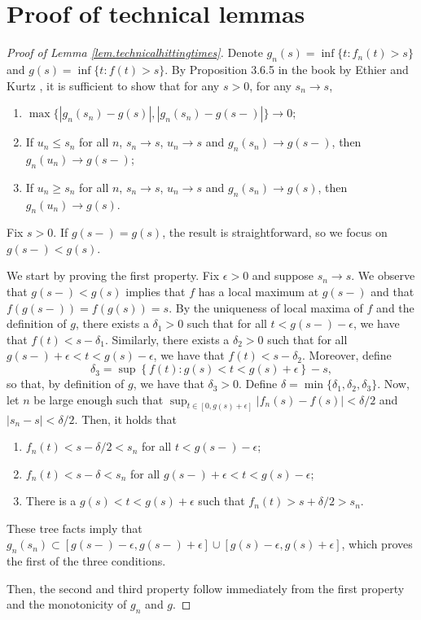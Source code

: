 \section{Proof of technical lemmas}\label{app.technical}
\begin{proof}[Proof of Lemma \ref{lem.technicalhittingtimes}]
Denote $g_n(s)=\inf\{t:f_n(t)>s\}$ and $g(s)=\inf\{t:f(t)>s\}$. By Proposition 3.6.5 in the book by Ethier and Kurtz \cite{ethierMarkovProcessesCharacterization2005}, it is sufficient to show that for any $s>0$, for any $s_n\to s$, 
\begin{enumerate}
    \item $\max\{|g_n(s_n)-g(s)|,|g_n(s_n)-g(s-)|\}\to 0$;
    \item If $u_n\leq s_n$ for all $n$, $s_n\to s$, $u_n\to s$ and $g_n(s_n)\to g(s-)$, then $g_n(u_n)\to g(s-)$;
    \item If $u_n\geq s_n$ for all $n$, $s_n\to s$, $u_n\to s$ and $g_n(s_n)\to g(s)$, then $g_n(u_n)\to g(s)$. 
\end{enumerate}
Fix $s>0$. If $g(s-)=g(s)$, the result is straightforward, so we focus on $g(s-)<g(s)$.  

We start by proving the first property. Fix $\epsilon>0$ and suppose $s_n\to s$. We observe that $g(s-)<g(s)$ implies that $f$ has a local maximum at $g(s-)$ and that $f(g(s-))=f(g(s))=s$. By the uniqueness of local maxima of $f$ and the definition of $g$, there exists a $\delta_1>0$ such that for all $t<g(s-)-\epsilon$, we have that $f(t)<s-\delta_1$. Similarly, there exists a $\delta_2>0$ such that for all $g(s-)+\epsilon<t<g(s)-\epsilon$, we have that $f(t)<s-\delta_2$. Moreover, define $$\delta_3=\sup\left\{f(t):g(s)<t<g(s)+\epsilon\right\}-s,$$ so that, by definition of $g$, we have that $\delta_3>0$. Define $\delta=\min\{\delta_1,\delta_2,\delta_3\}$. 
Now, let $n$ be large enough such that $\sup_{t\in [0,g(s)+\epsilon]}|f_n(s)-f(s)|<\delta/2$ and $|s_n-s|<\delta/2$. 
Then, it holds that 
\begin{enumerate}
    \item $f_n(t)<s-\delta/2<s_n$ for all $t<g(s-)-\epsilon$;
    \item $f_n(t)<s-\delta<s_n$ for all $g(s-)+\epsilon<t<g(s)-\epsilon$;
    \item There is a $g(s)<t<g(s)+\epsilon$ such that $f_n(t)>s+\delta/2>s_n$.
\end{enumerate}
These tree facts imply that $g_n(s_n)\subset [g(s-)-\epsilon,g(s-)+\epsilon]\cup[g(s)-\epsilon,g(s)+\epsilon]$, which proves the first of the three conditions.

Then, the second and third property follow immediately from the first property and the monotonicity of $g_n$ and $g$. \end{proof}

